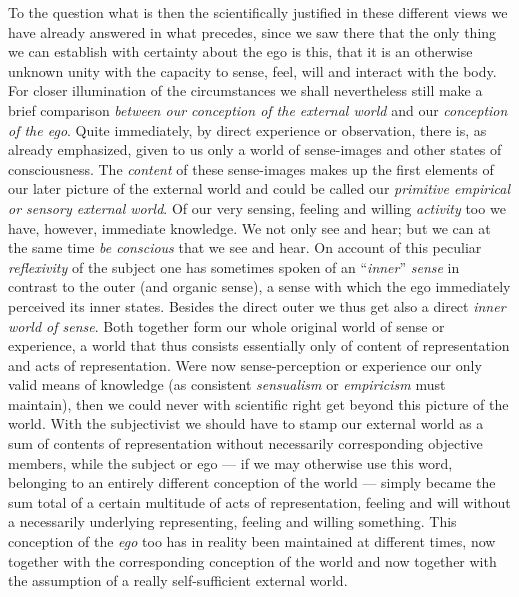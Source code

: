\documentclass[12pt,a4paper,openany]{book}
\newcommand{\opage}[1]{\marginnote{\footnotesize\textit{[#1]}}}
\begin{document}
To the question what is then the scientifically justified in these different views we
have already answered in what precedes, since we saw there that the only thing we can
establish with certainty about the ego is this, that it is an otherwise unknown unity with
the capacity to sense, feel, will and interact with the body. For closer illumination of
the circumstances we shall nevertheless still make a brief comparison \emph{between our
conception of the external world} and our
\emph{conception of the ego}. Quite immediately, by direct experience or observation,
there is, as already emphasized, given to us only a world of sense-images and other states
of consciousness. The \emph{con}\emph{tent} of these sense-images makes up the first
elements of our later picture of the external world and could be called our
\emph{primitive empirical or sensory external world}. Of our very sensing, feeling and
willing \emph{activity} too we have, however, immediate knowledge. We not only see and
hear; but we can at the same time \emph{be conscious} that we see and hear. On account of
this peculiar \emph{reflexivity} of the subject one has sometimes spoken
\setcounter{footnote}{0}%
\opage{257}of an ``\emph{inner}'' \emph{sense} in contrast to the outer (and organic sense), a
sense with which the ego immediately perceived its inner states. Besides the direct outer
we thus get also a direct \emph{inner world of sense}. Both together form our whole
original world of sense or experience, a world that thus consists essentially only of
content of representation and acts of representation. Were now sense-perception or
experience our only valid means of knowledge (as consistent \emph{sensualism} or
\emph{empiricism} must maintain), then we could never with scientific right get beyond
this picture of the world. With the subjectivist we should have to stamp our external
world as a sum of contents of representation without necessarily corresponding objective
members, while the subject or ego --- if we may otherwise use this word, belonging to an
entirely different conception of the world --- simply became the sum total of a certain
multitude of acts of representation, feeling and will without a necessarily underlying
representing, feeling and willing something. This conception of the \emph{ego} too has in reality
been maintained at different times, now together with the corresponding conception of the
world and now together with the assumption of a really self-sufficient external world.
\end{document}
